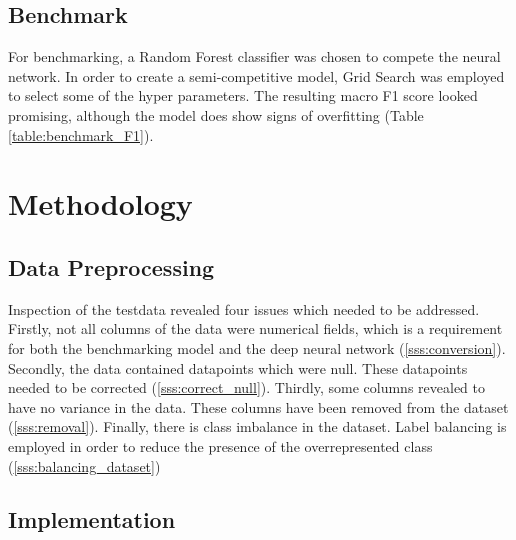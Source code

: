 \documentclass[preprint,12pt]{elsarticle}
\begin{document}
\subsection{Benchmark}
For benchmarking, a Random Forest classifier was chosen to compete the neural network. In order to create a semi-competitive model, Grid Search was employed to select some of the hyper parameters. The resulting macro F1 score looked promising, although the model does show signs of overfitting (Table \ref{table:benchmark_F1}).

\begin{table}[]
\caption{macro F1 score for benchmarking model}
\label{table:benchmark_F1}
\end{table}


\section{Methodology}
\label{S:3}

\subsection{Data Preprocessing}

Inspection of the testdata revealed four issues which needed to be addressed. Firstly, not all columns of the data were numerical fields, which is a requirement for both the benchmarking model and the deep neural network (\ref{sss:conversion}). Secondly, the data contained datapoints which were null. These datapoints needed to be corrected (\ref{sss:correct_null}). Thirdly, some columns revealed to have no variance in the data. These columns have been removed from the dataset (\ref{sss:removal}). Finally, there is class imbalance in the dataset. Label balancing is employed in order to reduce the presence of the overrepresented class (\ref{sss:balancing_dataset})

\subsection{Implementation}
\label{ss:implementation}
\end{document}
